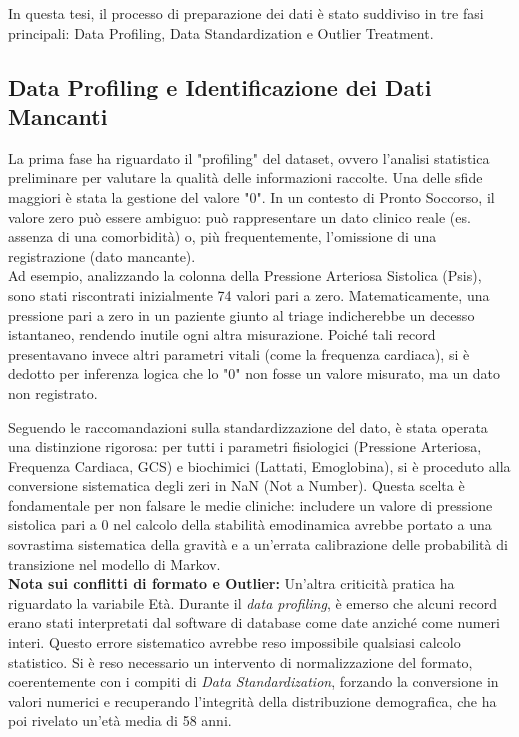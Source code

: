 \documentclass[11pt, oneside, noexaminfo]{sapthesis}   	%
\begin{document}
In questa tesi, il processo di preparazione dei dati è stato suddiviso in tre fasi principali: Data Profiling, Data Standardization e Outlier Treatment.

\subsection{Data Profiling e Identificazione dei Dati Mancanti}
La prima fase ha riguardato il "profiling" del dataset, ovvero l'analisi statistica preliminare per valutare la qualità delle informazioni raccolte. Una delle sfide maggiori è stata la gestione del valore "0". In un contesto di Pronto Soccorso, il valore zero può essere ambiguo: può rappresentare un dato clinico reale (es. assenza di una comorbidità) o, più frequentemente, l'omissione di una registrazione (dato mancante).\\

Ad esempio, analizzando la colonna della Pressione Arteriosa Sistolica (Psis), sono stati riscontrati inizialmente 74 valori pari a zero. Matematicamente, una pressione pari a zero in un paziente giunto al triage indicherebbe un decesso istantaneo, rendendo inutile ogni altra misurazione. Poiché tali record presentavano invece altri parametri vitali (come la frequenza cardiaca), si è dedotto per inferenza logica che lo "0" non fosse un valore misurato, ma un dato non registrato.

Seguendo le raccomandazioni sulla standardizzazione del dato, è stata operata una distinzione rigorosa: per tutti i parametri fisiologici (Pressione Arteriosa, Frequenza Cardiaca, GCS) e biochimici (Lattati, Emoglobina), si è proceduto alla conversione sistematica degli zeri in NaN (Not a Number). Questa scelta è fondamentale per non falsare le medie cliniche: includere un valore di pressione sistolica pari a 0 nel calcolo della stabilità emodinamica avrebbe portato a una sovrastima sistematica della gravità e a un’errata calibrazione delle probabilità di transizione nel modello di Markov.\\

\textbf{Nota sui conflitti di formato e Outlier:} 
Un'altra criticità pratica ha riguardato la variabile Età. Durante il \textit{data profiling}, è emerso che alcuni record erano stati interpretati dal software di database come date anziché come numeri interi. Questo errore sistematico avrebbe reso impossibile qualsiasi calcolo statistico. Si è reso necessario un intervento di normalizzazione del formato, coerentemente con i compiti di \textit{Data Standardization}, forzando la conversione in valori numerici e recuperando l'integrità della distribuzione demografica, che ha poi rivelato un'età media di 58 anni.\\
 
\end{document}

